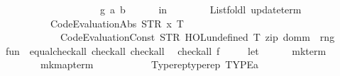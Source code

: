 \begin{isabellebody}
\ \ \ \ \ \ \ \ \ \ \ \ \ \ \ \ \ \ \ \ g{\isacharparenright}{\kern0pt}\ a{\isacharparenright}{\kern0pt}\ b{\isacharparenright}{\kern0pt}\isanewline
\ \ \ \ \ \ in\isanewline
\ \ \ \ \ \ \ \ List{\isachardot}{\kern0pt}foldl\ update{\isacharunderscore}{\kern0pt}term\isanewline
\ \ \ \ \ \ \ \ \ \ {\isacharparenleft}{\kern0pt}Code{\isacharunderscore}{\kern0pt}Evaluation{\isachardot}{\kern0pt}Abs\ {\isacharparenleft}{\kern0pt}STR\ {\isacharprime}{\kern0pt}{\isacharprime}{\kern0pt}x{\isacharprime}{\kern0pt}{\isacharprime}{\kern0pt}{\isacharparenright}{\kern0pt}\ T{}\isanewline
\ \ \ \ \ \ \ \ \ \ \ \ {\isacharparenleft}{\kern0pt}Code{\isacharunderscore}{\kern0pt}Evaluation{\isachardot}{\kern0pt}Const\ {\isacharparenleft}{\kern0pt}STR\ {\isacharprime}{\kern0pt}{\isacharprime}{\kern0pt}HOL{\isachardot}{\kern0pt}undefined{\isacharprime}{\kern0pt}{\isacharprime}{\kern0pt}{\isacharparenright}{\kern0pt}\ T{}{\isacharparenright}{\kern0pt}{\isacharparenright}{\kern0pt}\ {\isacharparenleft}{\kern0pt}zip\ {\isacharparenleft}{\kern0pt}domm\ {\isacharparenleft}{\kern0pt}{\isacharparenright}{\kern0pt}{\isacharparenright}{\kern0pt}\ {\isacharparenleft}{\kern0pt}rng\ {\isacharparenleft}{\kern0pt}{\isacharparenright}{\kern0pt}{\isacharparenright}{\kern0pt}{\isacharparenright}{\kern0pt}{\isacharparenright}{\kern0pt}{\isachardoublequoteclose}\isanewline
\isanewline
{}\isamarkupfalse%
\ {\isachardoublequoteopen}fun{\isachardoublequoteclose}\ {\isacharcolon}{\kern0pt}{\isacharcolon}{\kern0pt}\ {\isacharparenleft}{\kern0pt}{\isachardoublequoteopen}{\isacharbraceleft}{\kern0pt}equal{\isacharcomma}{\kern0pt}check{\isacharunderscore}{\kern0pt}all{\isacharbraceright}{\kern0pt}{\isachardoublequoteclose}{\isacharcomma}{\kern0pt}\ check{\isacharunderscore}{\kern0pt}all{\isacharparenright}{\kern0pt}\ check{\isacharunderscore}{\kern0pt}all\isanewline
{}\isanewline
\isanewline
{}\isamarkupfalse%
\isanewline
\ \ {\isachardoublequoteopen}check{\isacharunderscore}{\kern0pt}all\ f\ {\isacharequal}{\kern0pt}\isanewline
\ \ \ \ {\isacharparenleft}{\kern0pt}let\isanewline
\ \ \ \ \ \ mk{\isacharunderscore}{\kern0pt}term\ {\isacharequal}{\kern0pt}\isanewline
\ \ \ \ \ \ \ \ mk{\isacharunderscore}{\kern0pt}map{\isacharunderscore}{\kern0pt}term\isanewline
\ \ \ \ \ \ \ \ \ \ {\isacharparenleft}{\kern0pt}{\isasymlambda}{\isacharunderscore}{\kern0pt}{\isachardot}{\kern0pt}\ Typerep{\isachardot}{\kern0pt}typerep\ {\isacharparenleft}{\kern0pt}TYPE{\isacharparenleft}{\kern0pt}{\isacharprime}{\kern0pt}a{\isacharparenright}{\kern0pt}{\isacharparenright}{\kern0pt}{\isacharparenright}{\kern0pt}\isanewline

\end{isabellebody}
